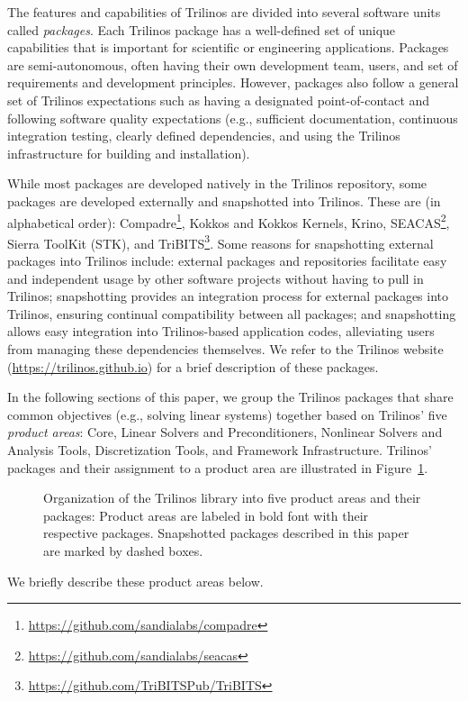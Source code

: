 
The features and capabilities of Trilinos are divided into several software units called \textit{packages}.
Each Trilinos package has a well-defined set of unique capabilities that is important for scientific or engineering applications. Packages are semi-autonomous, often having their own development team, users, and set of requirements and development principles.  However, packages also follow a general set of Trilinos expectations such as having a designated point-of-contact and following software quality expectations (e.g., sufficient documentation, continuous integration testing, clearly defined dependencies, and using the Trilinos infrastructure for building and installation).

While most packages are developed natively in the Trilinos repository, some packages are developed externally and snapshotted into Trilinos.
These are (in alphabetical order):
Compadre\footnote{\url{https://github.com/sandialabs/compadre}},
Kokkos and Kokkos Kernels,
Krino,
SEACAS\footnote{\url{https://github.com/sandialabs/seacas}},
Sierra ToolKit (STK),
and TriBITS\footnote{\url{https://github.com/TriBITSPub/TriBITS}}.
Some reasons for snapshotting external packages into Trilinos include:
external packages and repositories facilitate easy and independent usage by other software projects without having to pull in Trilinos;
snapshotting provides an integration process for external packages into Trilinos, ensuring continual compatibility between all packages;
and snapshotting allows easy integration into Trilinos-based application codes, alleviating users from managing these dependencies themselves.
We refer to the Trilinos website (\url{https://trilinos.github.io}) for a brief description of these packages.

In the following sections of this paper, we group the Trilinos packages that share common objectives (e.g., solving linear systems) together based on Trilinos' five \textit{product areas}:  Core, Linear Solvers and Preconditioners, Nonlinear Solvers and Analysis Tools, Discretization Tools, and Framework Infrastructure.
Trilinos' packages and their assignment to a product area are illustrated in Figure~\ref{fig:GraphicalOverview}.
\begin{figure}
\centering

\caption{Organization of the Trilinos library into five product areas and their packages: Product areas are labeled in bold font with their respective packages.
Snapshotted packages described in this paper are marked by dashed boxes.}
\label{fig:GraphicalOverview}
\end{figure}
We briefly describe these product areas below.

